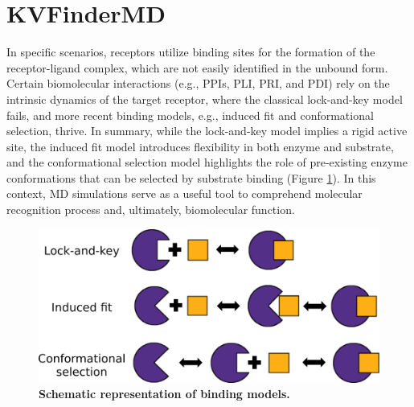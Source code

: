\documentclass[Ingles]{phdthesis}
\def\eg{e.g.\onedot}
\begin{document}
\section{KVFinderMD}

In specific scenarios, receptors utilize binding sites for the formation of the receptor-ligand complex, which are not easily identified in the unbound form. Certain biomolecular interactions (\eg, \acsp{PPI}, \acs{PLI}, \acs{PRI}, and \acs{PDI}) rely on the intrinsic dynamics of the target receptor, where the classical lock-and-key model fails, and more recent binding models, \eg, induced fit and conformational selection, thrive. In summary, while the lock-and-key model implies a rigid active site, the induced fit model introduces flexibility in both enzyme and substrate, and the conformational selection model highlights the role of pre-existing enzyme conformations that can be selected by substrate binding \cite{holyoak2013} (Figure \ref{fig:molecular-recognition}). In this context, \acs{MD} simulations serve as a useful tool to comprehend molecular recognition process and, ultimately, biomolecular function.

\begin{figure}[h]
  \centering
  \includegraphics[scale=0.3]{images/molecular-recognition.png}
  \caption[Schematic representation of binding models]{\textbf{Schematic representation of binding models.}}
  \label{fig:molecular-recognition}
\end{figure}
\end{document}
